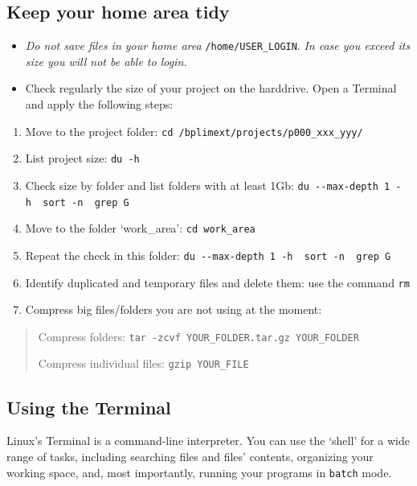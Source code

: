 \documentclass[
  11pt,
  a4paper,
]{article}
\providecommand{\tightlist}{%
  \setlength{\itemsep}{0pt}\setlength{\parskip}{0pt}}
\begin{document}
\hypertarget{keep-your-home-area-tidy}{%
\subsection{Keep your home area tidy}\label{keep-your-home-area-tidy}}

\begin{itemize}
\item
  \emph{Do not save files in your home area} \texttt{/home/USER\_LOGIN}.
  \emph{In case you exceed its size you will not be able to login.}
\item
  Check regularly the size of your project on the harddrive. Open a
  Terminal and apply the following steps:
\end{itemize}

\begin{enumerate}
\def\labelenumi{\arabic{enumi}.}
\tightlist
\item
  Move to the project folder:
  \texttt{cd\ /bplimext/projects/p000\_xxx\_yyy/}
\item
  List project size: \texttt{du\ -h}
\item
  Check size by folder and list folders with at least 1Gb:
  \texttt{du\ -\/-max-depth\ 1\ -h\ \textbar{}\ sort\ -n\ \textbar{}\ grep\ G}
\item
  Move to the folder `work\_area': \texttt{cd\ work\_area}
\item
  Repeat the check in this folder:
  \texttt{du\ -\/-max-depth\ 1\ -h\ \textbar{}\ sort\ -n\ \textbar{}\ grep\ G}
\item
  Identify duplicated and temporary files and delete them: use the
  command \texttt{rm}
\item
  Compress big files/folders you are not using at the moment:
\end{enumerate}

\begin{quote}
Compress folders: \texttt{tar\ -zcvf\ YOUR\_FOLDER.tar.gz\ YOUR\_FOLDER}

Compress individual files: \texttt{gzip\ YOUR\_FILE}
\end{quote}

\hypertarget{using-the-terminal}{%
\subsection{Using the Terminal}\label{using-the-terminal}}

Linux's Terminal is a command-line interpreter. You can use the `shell'
for a wide range of tasks, including searching files and files'
contents, organizing your working space, and, most importantly, running
your programs in \texttt{batch} mode.
\end{document}
